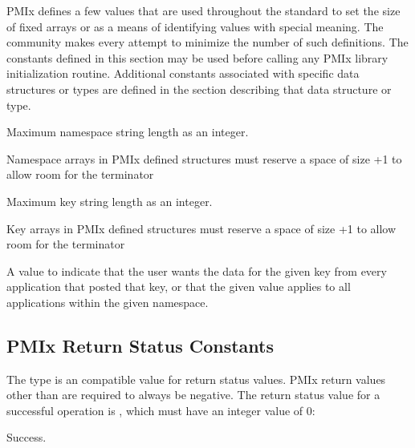 \ac{PMIx} defines a few values that are used throughout the standard to set the size of fixed arrays or as a means of identifying values with special meaning.
The community makes every attempt to minimize the number of such definitions.
The constants defined in this section may be used before calling any \ac{PMIx} library initialization routine.
Additional constants associated with specific data structures or types are defined in the section describing that data structure or type.

\begin{constantdesc}
%
Maximum namespace string length as an integer.
\end{constantdesc}

\adviceimplstart
Namespace arrays in \ac{PMIx} defined structures must reserve
a space of size +1 to allow room for the  terminator
\adviceimplend

\begin{constantdesc}
%
Maximum key string length as an integer.
\end{constantdesc}

\adviceimplstart
Key arrays in \ac{PMIx} defined structures must reserve
a space of size +1 to allow room for the  terminator
\adviceimplend

\begin{constantdesc}
%
A value to indicate that the user wants the data for the given key from every application that posted that key, or that the given value applies to all applications within the given namespace.
\end{constantdesc}


\subsection{PMIx Return Status Constants}
\label{api:struct:errors}

The  type is an  compatible value for return status values.
\ac{PMIx} return values other than  are required to always be negative.  The return status value for a successful operation is
, which must have an integer value of 0:

\begin{constantdesc}
Success.
\end{constantdesc}

